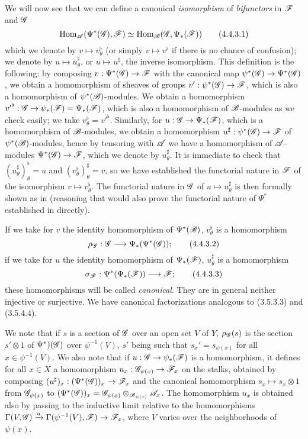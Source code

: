 \begin{env}[4.4.3]
\label{0.4.4.3}
We will now see that we can define a canonical \emph{isomorphism} of \emph{bifunctors} in
$\mathscr{F}$ and $\mathscr{G}$
\[
\label{0.4.4.3.1}
  {\mathop{\mathrm{Hom}}\nolimits}_\mathscr{A}(\Psi^*(\mathscr{G}),\mathscr{F})\simeq{\mathop{\mathrm{Hom}}\nolimits}_\mathscr{B}(\mathscr{G},\Psi_*(\mathscr{F}))
  \tag{4.4.3.1}
\]
which we denote by $v\mapsto v_\theta^\flat$ (or simply $v\mapsto v^\flat$ if there is no
chance of confusion); we denote by $u\mapsto u_\theta^\sharp$, or $u\mapsto u^\sharp$, the
inverse isomorphism. This definition is the following: by composing
$v:\Psi^*(\sh{G})\to\sh{F}$ with the canonical map $\psi^*(\sh{G})\to\Psi^*(\sh{G})$, we
obtain a homomorphism of sheaves of groups $v':\psi^*(\sh{G})\to\sh{F}$, which is also a
homomorphism of $\psi^*(\mathscr{B})$-modules. We obtain  a homomorphism
${v'}^\flat:\sh{G}\to\psi_*(\sh{F})=\Psi_*(\sh{F})$, which is also a homomorphism of
$\mathscr{B}$-modules as we
check easily; we take $v_\theta^\flat={v'}^\flat$. Similarly, for
$u:\sh{G}\to\Psi_*(\sh{F})$, which is a homomorphism of $\mathscr{B}$-modules, we obtain
 a homomorphism $u^\sharp:\psi^*(\sh{G})\to\sh{F}$ of
$\psi^*(\mathscr{B})$-modules, hence by tensoring with $\mathscr{A}$ we have a homomorphism of
$\mathscr{A}$-modules $\Psi^*(\sh{G})\to\sh{F}$, which we denote by $u_\theta^\sharp$. It is
immediate to check that $(u_\theta^\sharp)_\theta^\flat=u$ and
$(v_\theta^\flat)_\theta^\sharp=v$, so we have established the functorial nature in $\mathscr{F}$
of the isomorphism $v\mapsto v_\theta^\flat$. The functorial nature in $\mathscr{G}$ of
$u\mapsto u_\theta^\sharp$ is then formally shown as in  (reasoning that
would also prove the functorial nature of $\Psi^*$ established in 
directly).

If we take for $v$ the identity homomorphism of $\Psi^*(\mathscr{B})$, $v_\theta^\flat$ is a
homomorphism
\[
  \rho_\sh{G}:\sh{G}\to\Psi_*(\Psi^*(\sh{G}));
  \tag{4.4.3.2}
\]
if we take for $u$ the identity homomorphism of $\Psi_*(\mathscr{F})$, $u_\theta^\sharp$ is a
homomorphism
\[
  \sigma_\sh{F}:\Psi^*(\Psi_*(\sh{F}))\to\sh{F};
  \tag{4.4.3.3}
\]
these homomorphisms will be called \emph{canonical}. They are in general neither injective or
surjective. We have canonical factorizations analogous to (3.5.3.3) and (3.5.4.4).

We note that if $s$ is a section of $\mathscr{G}$ over an open set $V$ of $Y$, $\rho_\mathscr{G}(s)$ is
the section $s'\otimes 1$ of $\Psi^*)(\mathscr{G})$ over $\psi^{-1}(V)$, $s'$ being such that
$s_x'=s_{\psi(x)}$ for all $x\in\psi^{-1}(V)$. We also note that if
$u:\sh{G}\to\psi_*(\sh{F})$ is a homomorphism, it defines for all $x\in X$ a homomorphism
$u_x:\sh{G}_{\psi(x)}\to\sh{F}_x$ on the stalks, obtained by composing
$(u^\sharp)_x:(\Psi^*(\sh{G}))_x\to\sh{F}_x$ and the canonical homomorphism
$s_x\mapsto s_x\otimes 1$ from $\mathscr{G}_{\psi(x)}$ to
$(\Psi^*(\mathscr{G}))_x=\mathscr{G}_{\psi(x)}\otimes_{\mathscr{B}_{\psi(x)}}\mathscr{A}_x$. The homomorphism
$u_x$ is obtained also by passing to the inductive limit relative to the homomorphisms
$\Gamma(V,\sh{G})\xrightarrow{u}\Gamma(\psi^{-1}(V),\sh{F})\to\sh{F}_x$, where $V$ varies
over the neighborhoods of $\psi(x)$.
\end{env}

